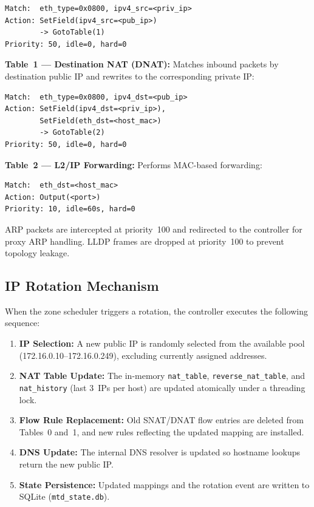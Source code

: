 \documentclass[conference]{IEEEtran}
\begin{document}
\begin{lstlisting}
Match:  eth_type=0x0800, ipv4_src=<priv_ip>
Action: SetField(ipv4_src=<pub_ip>)
        -> GotoTable(1)
Priority: 50, idle=0, hard=0
\end{lstlisting}

\textbf{Table~1 --- Destination NAT (DNAT):} Matches inbound packets by destination public IP and rewrites to the corresponding private IP:

\begin{lstlisting}
Match:  eth_type=0x0800, ipv4_dst=<pub_ip>
Action: SetField(ipv4_dst=<priv_ip>),
        SetField(eth_dst=<host_mac>)
        -> GotoTable(2)
Priority: 50, idle=0, hard=0
\end{lstlisting}

\textbf{Table~2 --- L2/IP Forwarding:} Performs MAC-based forwarding:

\begin{lstlisting}
Match:  eth_dst=<host_mac>
Action: Output(<port>)
Priority: 10, idle=60s, hard=0
\end{lstlisting}

ARP packets are intercepted at priority~100 and redirected to the controller for proxy ARP handling. LLDP frames are dropped at priority~100 to prevent topology leakage.

\subsection{IP Rotation Mechanism}

When the zone scheduler triggers a rotation, the controller executes the following sequence:

\begin{enumerate}
    \item \textbf{IP Selection:} A new public IP is randomly selected from the available pool (172.16.0.10--172.16.0.249), excluding currently assigned addresses.
    \item \textbf{NAT Table Update:} The in-memory \texttt{nat\_table}, \texttt{reverse\_nat\_table}, and \texttt{nat\_history} (last 3~IPs per host) are updated atomically under a threading lock.
    \item \textbf{Flow Rule Replacement:} Old SNAT/DNAT flow entries are deleted from Tables~0 and~1, and new rules reflecting the updated mapping are installed.
    \item \textbf{DNS Update:} The internal DNS resolver is updated so hostname lookups return the new public IP.
    \item \textbf{State Persistence:} Updated mappings and the rotation event are written to SQLite (\texttt{mtd\_state.db}).
\end{enumerate}
\end{document}
